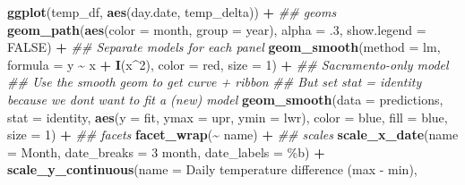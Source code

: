 \documentclass[
]{article}
\newenvironment{Shaded}{\begin{snugshade}}{\end{snugshade}}
\newcommand{\CommentTok}[1]{\textcolor[rgb]{0.56,0.35,0.01}{\textit{#1}}}
\newcommand{\DataTypeTok}[1]{\textcolor[rgb]{0.13,0.29,0.53}{#1}}
\newcommand{\DecValTok}[1]{\textcolor[rgb]{0.00,0.00,0.81}{#1}}
\newcommand{\FloatTok}[1]{\textcolor[rgb]{0.00,0.00,0.81}{#1}}
\newcommand{\KeywordTok}[1]{\textcolor[rgb]{0.13,0.29,0.53}{\textbf{#1}}}
\newcommand{\NormalTok}[1]{#1}
\newcommand{\OperatorTok}[1]{\textcolor[rgb]{0.81,0.36,0.00}{\textbf{#1}}}
\newcommand{\OtherTok}[1]{\textcolor[rgb]{0.56,0.35,0.01}{#1}}
\newcommand{\StringTok}[1]{\textcolor[rgb]{0.31,0.60,0.02}{#1}}
\begin{document}
\begin{Shaded}
\begin{Highlighting}[]
\KeywordTok{ggplot}\NormalTok{(temp\_df, }\KeywordTok{aes}\NormalTok{(day.date, temp\_delta)) }\OperatorTok{+}
\StringTok{    }\CommentTok{\#\# geoms}
\StringTok{    }\KeywordTok{geom\_path}\NormalTok{(}\KeywordTok{aes}\NormalTok{(}\DataTypeTok{color =}\NormalTok{ month, }\DataTypeTok{group =}\NormalTok{ year), }\DataTypeTok{alpha =} \FloatTok{.3}\NormalTok{, }\DataTypeTok{show.legend =} \OtherTok{FALSE}\NormalTok{) }\OperatorTok{+}
\StringTok{    }\CommentTok{\#\# Separate models for each panel}
\StringTok{    }\KeywordTok{geom\_smooth}\NormalTok{(}\DataTypeTok{method =}\NormalTok{ lm, }\DataTypeTok{formula =}\NormalTok{ y }\OperatorTok{\textasciitilde{}}\StringTok{ }\NormalTok{x }\OperatorTok{+}\StringTok{ }\KeywordTok{I}\NormalTok{(x}\OperatorTok{\^{}}\DecValTok{2}\NormalTok{),}
                \DataTypeTok{color =} \StringTok{\textquotesingle{}red\textquotesingle{}}\NormalTok{, }\DataTypeTok{size =} \DecValTok{1}\NormalTok{) }\OperatorTok{+}
\StringTok{    }\CommentTok{\#\# Sacramento{-}only model}
\StringTok{    }\CommentTok{\#\# Use the smooth geom to get curve + ribbon}
\StringTok{    }\CommentTok{\#\# But set \textasciigrave{}stat = \textquotesingle{}identity\textquotesingle{}\textasciigrave{} because we don\textquotesingle{}t want to fit a (new) model}
\StringTok{    }\KeywordTok{geom\_smooth}\NormalTok{(}\DataTypeTok{data =}\NormalTok{ predictions, }\DataTypeTok{stat =} \StringTok{\textquotesingle{}identity\textquotesingle{}}\NormalTok{,}
                \KeywordTok{aes}\NormalTok{(}\DataTypeTok{y =}\NormalTok{ fit, }\DataTypeTok{ymax =}\NormalTok{ upr, }\DataTypeTok{ymin =}\NormalTok{ lwr),}
                \DataTypeTok{color =} \StringTok{\textquotesingle{}blue\textquotesingle{}}\NormalTok{, }\DataTypeTok{fill =} \StringTok{\textquotesingle{}blue\textquotesingle{}}\NormalTok{, }\DataTypeTok{size =} \DecValTok{1}\NormalTok{) }\OperatorTok{+}
\StringTok{    }\CommentTok{\#\# facets}
\StringTok{    }\KeywordTok{facet\_wrap}\NormalTok{(}\OperatorTok{\textasciitilde{}}\StringTok{ }\NormalTok{name) }\OperatorTok{+}
\StringTok{    }\CommentTok{\#\# scales}
\StringTok{    }\KeywordTok{scale\_x\_date}\NormalTok{(}\DataTypeTok{name =} \StringTok{\textquotesingle{}Month\textquotesingle{}}\NormalTok{, }\DataTypeTok{date\_breaks =} \StringTok{\textquotesingle{}3 month\textquotesingle{}}\NormalTok{, }\DataTypeTok{date\_labels =} \StringTok{\textquotesingle{}\%b\textquotesingle{}}\NormalTok{) }\OperatorTok{+}\StringTok{  }
\StringTok{    }\KeywordTok{scale\_y\_continuous}\NormalTok{(}\DataTypeTok{name =} \StringTok{\textquotesingle{}Daily temperature difference (max {-} min)\textquotesingle{}}\NormalTok{, }

\end{Highlighting}
\end{Shaded}
\end{document}
